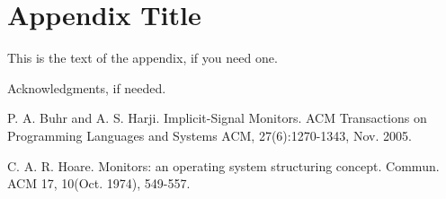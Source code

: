 \documentclass[preprint]{sigplanconf}
\begin{document}
\appendix
\section{Appendix Title}

This is the text of the appendix, if you need one.

\acks

Acknowledgments, if needed.





\begin{thebibliography}{}
    \softraggedright

    P. A. Buhr and A. S. Harji. Implicit-Signal Monitors. ACM Transactions on 
    Programming Languages and Systems ACM, 27(6):1270-1343, Nov. 2005.

     C. A. R. Hoare. Monitors: an operating system structuring concept. Commun. 
     ACM 17, 10(Oct. 1974), 549-557.

\end{thebibliography}
\end{document}
